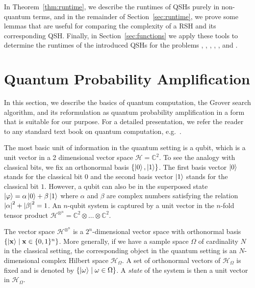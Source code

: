 \documentclass[a4paper,11pt]{article}
\begin{document}
In Theorem~\ref{thm:runtime}, we describe the runtimes of QSHs purely in non-quantum terms, and in the remainder of Section~\ref{sec:runtime}, we prove some lemmas that are useful for comparing the complexity of a RSH and its corresponding QSH. Finally, in Section~\ref{sec:functions} we apply these tools to determine the runtimes of the introduced QSHs for the problems \onemax, \leadingones, \discrepancy, \needle, \jumpm, and \tinytrap.


\section{Quantum Probability Amplification} \label{sec:quantum}

In this section, we describe the basics of quantum computation, the Grover search algorithm, and its reformulation as quantum probability amplification in a form that is suitable for our purpose. For a detailed presentation, we refer the reader to any standard text book on quantum computation, e.g.~\cite{nielsenchuang:book}.

The most basic unit of information in the quantum setting is a qubit, which is a unit vector in a 2 dimensional vector space $\mathcal{H} =\mathbb{C}^2$. To see the analogy with classical bits, we fix an orthonormal basis $\{\left\vert 0 \right\rangle,\left\vert 1 \right\rangle\}$. The first basis vector $\left\vert 0 \right\rangle$ stands for the classical bit $0$ and the second basis vector $\left\vert 1 \right\rangle$ stands for the classical bit $1$. However, a qubit can also be in the superposed state $\left\vert \varphi \right\rangle = \alpha \left\vert 0 \right\rangle + \beta \left\vert 1 \right\rangle$ where $\alpha$ and $\beta$ are complex numbers satisfying the relation $\left\vert \alpha \right\vert^2 + \left\vert \beta \right\vert^2 = 1$. An $n$-qubit system is captured by a unit vector in the $n$-fold tensor product $\mathcal{H}^{\otimes^n}=\mathbb{C}^2 \otimes\dots\otimes \mathbb{C}^2$.

The vector space $\mathcal{H}^{\otimes^n}$ is a $2^n$-dimensional vector space with orthonormal basis $\left\{ \ket{\xvec}\mid\xvec \in \{0,1\}^n \right\}$. More generally, if we have a sample space $\Omega$ of cardinality $N$ in the classical setting, the corresponding object in the quantum setting is an $N$-dimensional complex Hilbert space $\mathcal{H}_\Omega$. A set of orthonormal vectors of $\mathcal{H}_\Omega$ is fixed and is denoted by $\{\left\vert \omega \right\rangle\mid\omega \in \Omega \}$. A \emph{state} of the system is then a unit vector in $\mathcal{H}_\Omega$.
\end{document}
